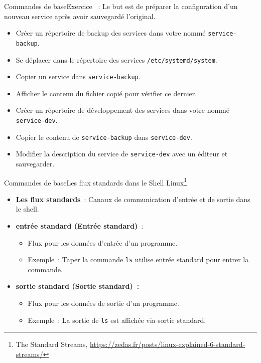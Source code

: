 \documentclass{beamer}
\begin{document}
    \begin{frame}{Commandes de base}{Exercice \execcounterdispinc{}~:}
        Le but est de préparer la configuration d'un nouveau service après avoir sauvegardé l'original.
        \begin{itemize}
            \item Créer un répertoire de backup des services dans votre  nommé \lstinline{service-backup}.
            \item Se déplacer dans le répertoire des services \lstinline{/etc/systemd/system}.
            \item Copier un service dans \lstinline{service-backup}.
            \item Afficher le contenu du fichier copié pour vérifier ce dernier.
            \item Créer un répertoire de développement des services dans votre  nommé \lstinline{service-dev}.
            \item Copier le contenu de \lstinline{service-backup} dans \lstinline{service-dev}.
            \item Modifier la description du service de \lstinline{service-dev} avec un éditeur et sauvegarder.
        \end{itemize}
    \end{frame}

    \begin{frame}{Commandes de base}{Les flux standards dans le Shell Linux\footnote{\label{standard-stream}The Standard Streams, \url{https://zedas.fr/posts/linux-explained-6-standard-streams/}}}
        \begin{itemize}
            \item \textbf{Les flux standards}~: Canaux de communication d'entrée et de sortie dans le shell.
            \item \textbf{entrée standard (Entrée standard)}~:
            \begin{itemize}
                \item Flux pour les données d'entrée d'un programme.
                \item Exemple~: Taper la commande \lstinline{ls} utilise entrée standard pour entrer la commande.
            \end{itemize}
            \item \textbf{sortie standard (Sortie standard)~:}
            \begin{itemize}
                \item Flux pour les données de sortie d'un programme.
                \item Exemple~: La sortie de \lstinline{ls} est affichée via sortie standard.
            \end{itemize}
        \end{itemize}
    \end{frame}
\end{document}

